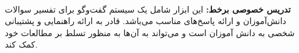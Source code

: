 \\
\textbf { تدریس خصوصی برخط:}
این ابزار شامل یک سیستم گفت‌وگو برای تفسیر سوالات دانش‌آموزان و ارائه پاسخ‌های مناسب می‌باشد. قادر به ارائه راهنمایی و پشتیبانی شخصی به دانش آموزان است و می‌تواند به آن‌ها به منظور تسلط بر مطالعات خود کمک کند.
\begin{figure}[!htb]
	\centering
	\quad

\end{figure}

